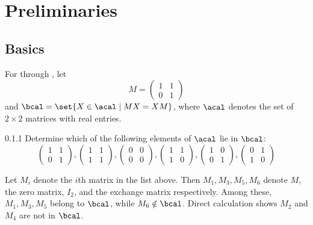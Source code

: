 \setcounter{section}{-1}
\section{Preliminaries}

\subsection{Basics}

For  through , let
\[
    M = 
    \begin{pmatrix}
        1 & 1 \\
        0 & 1
    \end{pmatrix}
\]
and $\bcal = \set{X \in \acal \mid MX = XM}$, where $\acal$ denotes the set of $2 \times 2$ matrices with real entries.

\begin{exercise}{0.1.1}
    Determine which of the following elements of $\acal$ lie in $\bcal$:
    \[
        \begin{pmatrix}
            1 & 1 \\
            0 & 1
        \end{pmatrix},
        \begin{pmatrix}
            1 & 1 \\
            1 & 1
        \end{pmatrix},
        \begin{pmatrix}
            0 & 0 \\
            0 & 0
        \end{pmatrix},
        \begin{pmatrix}
            1 & 1 \\
            1 & 0
        \end{pmatrix},
        \begin{pmatrix}
            1 & 0 \\
            0 & 1
        \end{pmatrix},
        \begin{pmatrix}
            0 & 1 \\
            1 & 0 
        \end{pmatrix}
    \]
\end{exercise}

\begin{sol}
    Let $M_i$ denote the $i$th matrix in the list above.
	Then $M_1, M_3, M_5, M_6$ denote $M$, the zero matrix, $I_2$, and the exchange matrix respectively.
	Among these, $M_1, M_3, M_5$ belong to $\bcal$, while $M_6 \notin \bcal$.
	Direct calculation shows $M_2$ and $M_4$ are not in $\bcal$.
\end{sol}

